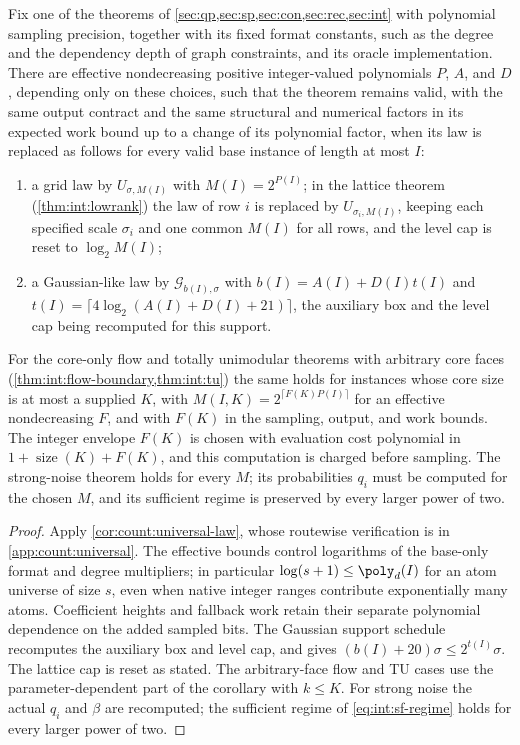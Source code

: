 \begin{proposition}\label{prop:model:uniform}
Fix one of the theorems of \cref{sec:qp,sec:sp,sec:con,sec:rec,sec:int}
with polynomial sampling precision, together with its fixed format
constants, such as the degree and the dependency depth of graph constraints,
and its oracle implementation. There are effective nondecreasing
positive integer-valued polynomials $P$, $A$, and $D$, depending only on these choices, such that the
theorem remains valid, with the same output contract and the same
structural and numerical factors in its expected work bound up to a change
of its polynomial factor, when its law is replaced as follows for every
valid base instance of length at most $I$:
\begin{enumerate}[label=(\alph*)]
\item a grid law by $U_{\sigma,M(I)}$ with $M(I)=2^{P(I)}$; in the lattice
theorem (\cref{thm:int:lowrank}) the law of row $i$ is replaced by
$U_{\sigma_i,M(I)}$, keeping each specified scale $\sigma_i$ and one common
$M(I)$ for all rows, and the level cap is reset to $\log_2M(I)$;
\item a Gaussian-like law by $\mathcal G_{b(I),\sigma}$ with
$b(I)=A(I)+D(I)t(I)$ and $t(I)=\lceil4\log_2(A(I)+D(I)+21)\rceil$, the
auxiliary box and the level cap being recomputed for this support.
\end{enumerate}
For the core-only flow and totally unimodular theorems with arbitrary core
faces (\cref{thm:int:flow-boundary,thm:int:tu}) the same holds for instances
whose core size is at most a supplied $K$, with $M(I,K)=2^{\lceil
F(K)P(I)\rceil}$ for an effective nondecreasing $F$, and with $F(K)$ in the
sampling, output, and work bounds. The integer envelope $F(K)$ is chosen
with evaluation cost polynomial in $1+\operatorname{size}(K)+F(K)$,
and this computation is charged before sampling. The strong-noise theorem holds for every
$M$; its probabilities $q_i$ must be computed for the chosen $M$, and its
sufficient regime is preserved by every larger power of two.
\end{proposition}

\begin{proof}
Apply \cref{cor:count:universal-law}, whose routewise verification is in
\cref{app:count:universal}. The effective bounds control logarithms of the
base-only format and degree multipliers; in particular
$\log(s+1)\le\poly_d(I)$ for an atom universe of size $s$, even when native
integer ranges contribute exponentially many atoms. Coefficient heights and
fallback work retain their separate polynomial dependence on the added
sampled bits. The Gaussian support schedule recomputes the auxiliary box and
level cap, and gives $(b(I)+20)\sigma\le2^{t(I)}\sigma$.
The lattice cap is reset as stated. The arbitrary-face flow and TU cases use
the parameter-dependent part of the corollary with $k\le K$.
For strong noise the actual $q_i$ and $\beta$ are recomputed; the sufficient
regime of \cref{eq:int:sf-regime} holds for every larger power of two.
\end{proof}

